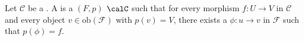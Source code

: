 \begin{definition} \label{definition:fibered_category_over_a_category}
Let $\mathcal{C}$ be a . 
A  is a $(F,p)$  $\calC$ such that for every morphism $f: U \to V$ in $\mathcal{C}$ and every object $v \in \text{ob}(\mathcal{F})$ with $p(v) = V$, there exists a  $\phi: u \to v$ in $\mathcal{F}$ such that $p(\phi) = f$.
\end{definition}